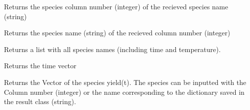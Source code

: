 \documentclass[letterpaper,10pt,english]{sphinxmanual}
\begin{document}
\begin{fulllineitems}

\begin{fulllineitems}
\label{FittingClasses:FitInfo.Fit_one_run.SpeciesIndex}
Returns the species column number (integer) of the recieved species name (string)

\end{fulllineitems}


\begin{fulllineitems}
\label{FittingClasses:FitInfo.Fit_one_run.SpeciesName}
Returns the species name (string) of the recieved column number (integer)

\end{fulllineitems}


\begin{fulllineitems}
\label{FittingClasses:FitInfo.Fit_one_run.SpeciesNames}
Returns a list with all species names (including time and temperature).

\end{fulllineitems}


\begin{fulllineitems}
\label{FittingClasses:FitInfo.Fit_one_run.Time}
Returns the time vector

\end{fulllineitems}


\begin{fulllineitems}
\label{FittingClasses:FitInfo.Fit_one_run.Yield}
Returns the Vector of the species yield(t). The species can be inputted with the Column number (integer) or the name corresponding to the dictionary saved in the result class (string).

\end{fulllineitems}



\end{fulllineitems}
\end{document}
